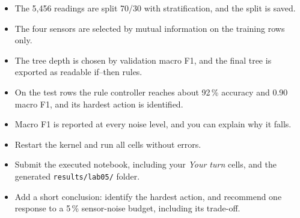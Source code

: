 \begin{verification}
\begin{itemize}
  \item The 5,456 readings are split 70/30 with stratification, and the split is saved.
  \item The four sensors are selected by mutual information on the training rows only.
  \item The tree depth is chosen by validation macro F1, and the final tree is exported as readable if--then rules.
  \item On the test rows the rule controller reaches about 92\,\% accuracy and 0.90 macro F1, and its hardest action is identified.
  \item Macro F1 is reported at every noise level, and you can explain why it falls.
\end{itemize}
\end{verification}

\begin{labdeliverable}
\begin{itemize}
  \item Restart the kernel and run all cells without errors.
  \item Submit the executed notebook, including your \emph{Your turn} cells, and the generated \texttt{results/lab05/} folder.
  \item Add a short conclusion: identify the hardest action, and recommend one response to a 5\,\% sensor-noise budget, including its trade-off.
\end{itemize}
\end{labdeliverable}
